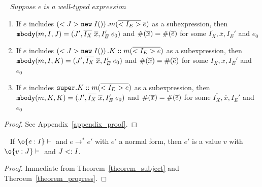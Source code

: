 \begin{theorem}[Progress]~\label{theorem_progress}
$\textit{Suppose } e \textit{ is a well-typed expression } $ \\
\begin{enumerate}
\item If $e$ includes $\left(<J>\texttt{new} \; I()\right).m(\overline{<I_E>} \; \overline{e})$ as a subexpression,
    then $ \texttt{mbody}(m, I, J) = (J', \overline{I_X} \; \overline{x}, I'_E \; e_0) $ and
         $\#(\overline{x}) = \#(\overline{e})$ for some $\overline{I_X}, \overline{x}, I_E'$ and $e_0$
\item If $e$ includes $\left(<J>\texttt{new} \; I()\right).K::m(\overline{<I_E> e})$ as a subexpression,
    then $ \texttt{mbody}(m, I, K) = (J', \overline{I_X} \; \overline{x}, I'_E \; e_0) $ and 
         $\#(\overline{x}) = \#(\overline{e})$ for some $\overline{I_X}, \overline{x}, I_E'$ and $e_0$
\item If $e$ includes $\texttt{super}.K::m(\overline{<I_E> e})$ as a subexpression,
    then $ \texttt{mbody}(m, K, K) = (J', \overline{I_X} \; \overline{x}, I'_E \; e_0) $ and 
         $\#(\overline{x}) = \#(\overline{e})$ for some $\overline{I_X}, \overline{x}, I_E'$ and $e_0$
\end{enumerate}
\end{theorem}
\begin{proof}
See Appendix~\ref{appendix_proof}.
\end{proof}

\begin{theorem}~\label{theorem_soundness}
If $\judgeewf \o {e : I}$ and $e \to^* e'$ with $e'$ a normal form, then $e'$ is 
a value $v$ with $\judgeewf \o {v:J}$ and $J <: I$.
\end{theorem}
\begin{proof}
Immediate from Theorem~\ref{theorem_subject} and Theroem~\ref{theorem_progress}.
\end{proof}

